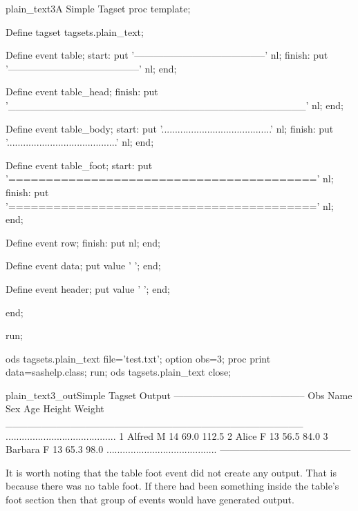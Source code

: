 \begin{fvcode}{plain_text3}{A Simple Tagset}
 proc template;

     Define tagset tagsets.plain_text;

         Define event table;
             start:
                 put '-----------------------------------------' nl;
             finish:
                 put '-----------------------------------------' nl;
         end;

         Define event table_head;
             finish:
                 put '_________________________________________' nl;
         end;

         Define event table_body;
             start:
                 put '.........................................' nl;
             finish:
                 put '.........................................' nl;
         end;

         Define event table_foot;
             start:
                 put '=========================================' nl;
             finish:
                 put '=========================================' nl;
         end;

         Define event row;
             finish:
             put nl;
         end;

         Define event data;
             put value '   ';
         end;

         Define event header;
             put value ' ';
         end;


     end; 

 run;

     
 ods tagsets.plain_text file='test.txt';
 option obs=3;
 proc print data=sashelp.class; run;
 ods tagsets.plain_text close;

\end{fvcode}

\begin{poutput}{plain_text3_out}{Simple Tagset Output}
-----------------------------------------
Obs Name Sex Age Height Weight 
_________________________________________
.........................................
 1 Alfred   M   14   69.0   112.5   
 2 Alice   F   13   56.5    84.0   
 3 Barbara   F   13   65.3    98.0   
.........................................
-----------------------------------------
\end{poutput}

It is worth noting that the table foot event did not create
any output.  That is because there was no table foot.  If there
had been something inside the table's foot section then that
group of events would have generated output.

